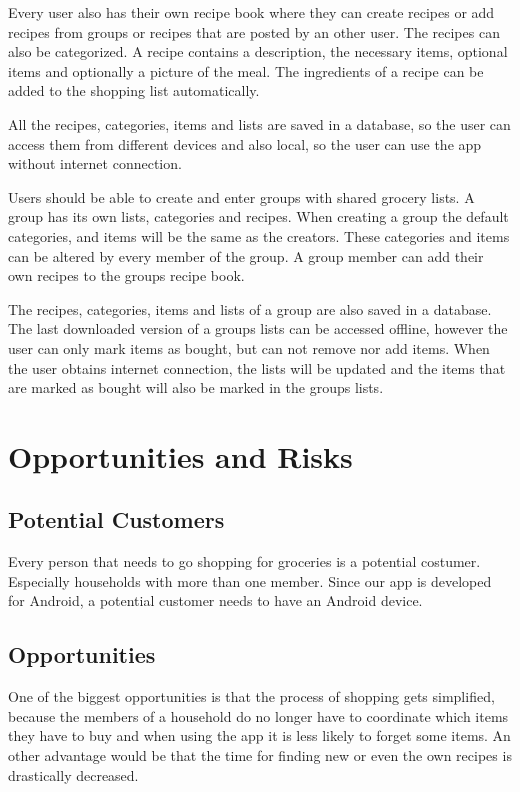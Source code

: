 \documentclass[12pt]{article}
\theoremstyle{definition}
\begin{document}
Every user also has their own recipe book where they can create recipes or add recipes from groups or recipes that are posted by an other user. The recipes can also be categorized. A recipe contains a description, the necessary items, optional items and optionally a picture of the meal. The ingredients of a recipe can be added to the shopping list automatically.

All the recipes, categories, items and lists are saved in a database, so the user can access them from different devices and also local, so the user can use the app without internet connection.

Users should be able to create and enter groups with shared grocery lists. A group has its own lists, categories and recipes. When creating a group the default categories, and items will be the same as the creators. These categories and items can be altered by every member of the group. A group member can add their own recipes to the groups recipe book.

The recipes, categories, items and lists of a group are also saved in a database. The last downloaded version of a groups lists can be accessed offline, however the user can only mark items as bought, but can not remove nor add items. When the user obtains internet connection, the lists will be updated and the items that are marked as bought will also be marked in the groups lists.

\pagebreak

\section{Opportunities and Risks}
\subsection{Potential Customers}
Every person that needs to go shopping for groceries is a potential costumer. Especially households with more than one member. Since our app is developed for Android, a potential customer needs to have an Android device.

\subsection{Opportunities}
One of the biggest opportunities is that the process of shopping gets simplified, because the members of a household do no longer have to coordinate which items they have to buy and when using the app it is less likely to forget some items. An other advantage would be that the time for finding new or even the own recipes is drastically decreased.
\end{document}
